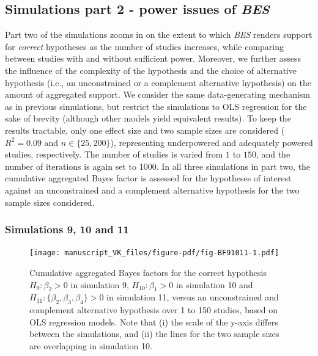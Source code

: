 \documentclass[
]{interact}
\begin{document}
\hypertarget{simulations-part-2---power-issues-of-bes}{%
\subsection{\texorpdfstring{Simulations part 2 - power issues of
\emph{BES}}{Simulations part 2 - power issues of BES}}\label{simulations-part-2---power-issues-of-bes}}

Part two of the simulations zooms in on the extent to which \emph{BES}
renders support for \emph{correct} hypotheses as the number of studies
increases, while comparing between studies with and without sufficient
power. Moreover, we further assess the influence of the complexity of
the hypothesis and the choice of alternative hypothesis (i.e., an
unconstrained or a complement alternative hypothesis) on the amount of
aggregated support. We consider the same data-generating mechanism as in
previous simulations, but restrict the simulations to OLS regression for
the sake of brevity (although other models yield equivalent results). To
keep the results tractable, only one effect size and two sample sizes
are considered (\(R^2 = 0.09\) and \(n \in \{25, 200\}\)), representing
underpowered and adequately powered studies, respectively. The number of
studies is varied from \(1\) to \(150\), and the number of iterations is
again set to 1000. In all three simulations in part two, the cumulative
aggregated Bayes factor is assessed for the hypotheses of interest
against an unconstrained and a complement alternative hypothesis for the
two sample sizes considered.

\hypertarget{simulations-9-10-and-11}{%
\subsubsection{Simulations 9, 10 and 11}\label{simulations-9-10-and-11}}

\begin{figure}[!h]

{\centering \texttt{[image: manuscript\_VK\_files/figure-pdf/fig-BF91011-1.pdf]}

}

\caption{\label{fig-BF91011}Cumulative aggregated Bayes factors for the
correct hypothesis \(H_9: \beta_2 > 0\) in simulation 9,
\(H_{10}: \beta_1 > 0\) in simulation 10 and
\(H_{11}: \{\beta_2, \beta_3, \beta_4\} > 0\) in simulation 11, versus
an unconstrained and complement alternative hypothesis over 1 to 150
studies, based on OLS regression models. Note that (i) the scale of the
y-axis differs between the simulations, and (ii) the lines for the two
sample sizes are overlapping in simulation 10.}

\end{figure}
\end{document}

